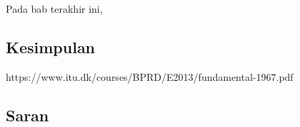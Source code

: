 \chapter{\babTujuh}
Pada bab terakhir ini, 
\section{Kesimpulan}

https://www.itu.dk/courses/BPRD/E2013/fundamental-1967.pdf

\section{Saran}
